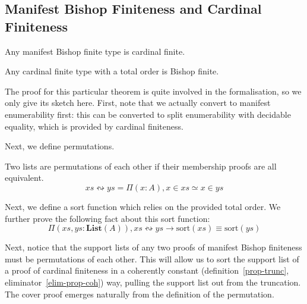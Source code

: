 \subsection{Manifest Bishop Finiteness and Cardinal Finiteness}
\begin{lemma} \label{manifest-bishop-to-cardinal}
  Any manifest Bishop finite type is cardinal finite.
\end{lemma}
\begin{theorem} \label{cardinal-to-manifest-bishop}
  Any cardinal finite type with a total order is Bishop finite.
\end{theorem}
The proof for this particular theorem is quite involved in the formalisation, so
we only give its sketch here.
First, note that we actually convert to manifest enumerability first: this can
be converted to split enumerability with decidable equality, which is provided
by cardinal finiteness.

Next, we define permutations.
\begin{definition}
  Two lists are permutations of each other if their membership proofs are all
  equivalent\footnotemark \cite{danielssonBagEquivalenceProofRelevant2012}.
  \begin{equation}
    \mathit{xs} \leftrightsquigarrow \mathit{ys} = \Pi {(x : A)} , x \in \mathit{xs} \simeq x \in \mathit{ys}
  \end{equation}
\end{definition}


Next, we define a sort function which relies on the provided total order.
We further prove the following fact about this sort function:
\begin{equation}
  \Pi(\mathit{xs}, \mathit{ys} : \mathbf{List}(A)) , \mathit{xs} \leftrightsquigarrow \mathit{ys} \rightarrow \text{sort}(\mathit{xs}) \equiv \text{sort}(\mathit{ys})
\end{equation}

Next, notice that the support lists of any two proofs of manifest Bishop
finiteness must be permutations of each other.
This will allow us to sort the support list of a proof of cardinal finiteness in
a coherently constant (definition~\ref{prop-trunc},
eliminator~\ref{elim-prop-coh}) way, pulling the support list out from the
truncation.
The cover proof emerges naturally from the definition of the permutation.
